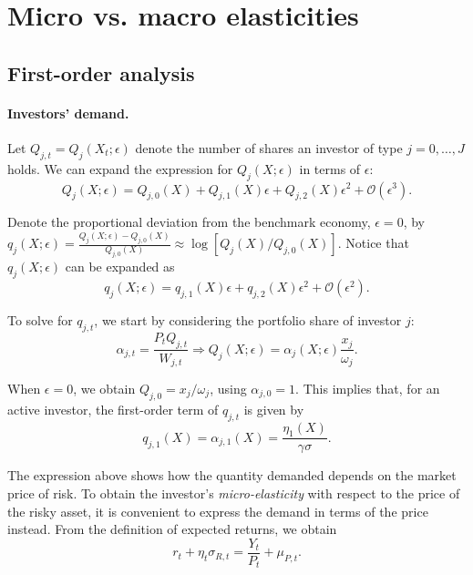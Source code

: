 \documentclass[11pt,english]{article}
\begin{document}
\section{Micro vs. macro elasticities}

\subsection{First-order analysis}

\paragraph{Investors' demand.} Let $Q_{j,t} = Q_j(X_t;\epsilon)$ denote the number of shares an investor of type $j = 0, \ldots, J$ holds. We can expand the expression for $Q_{j}(X;\epsilon)$ in terms of $\epsilon$:
\begin{equation}
    Q_j(X;\epsilon) = Q_{j,0}(X) + Q_{j,1}(X) \epsilon + Q_{j,2}(X) \epsilon^2 + \mathcal{O}(\epsilon^3).
\end{equation}

Denote the proportional deviation from the benchmark economy, $\epsilon = 0$, by $q_{j}(X;\epsilon) = \frac{Q_{j}(X;\epsilon) - Q_{j,0}(X)}{Q_{j,0}(X)} \approx \log [Q_{j}(X)/Q_{j,0}(X)]$. Notice that $q_{j}(X;\epsilon)$ can be expanded as
\begin{equation}
    q_{j}(X;\epsilon) = q_{j,1}(X) \epsilon + q_{j,2}(X) \epsilon^2 + \mathcal{O}(\epsilon^2).
\end{equation}

To solve for $q_{j,t}$, we start by considering the portfolio share of investor $j$:
\begin{equation}
\alpha_{j,t} = \frac{P_t Q_{j,t}}{W_{j,t}} \Rightarrow   Q_{j}(X;\epsilon) = \alpha_j(X;\epsilon) \frac{x_{j}}{\omega_j}.
\end{equation}

When $\epsilon = 0$, we obtain $Q_{j,0} = x_j/\omega_j$, using $\alpha_{j,0} = 1$. This implies that, for an active investor, the first-order term of $q_{j,t}$ is given by
\begin{equation}\label{eq:q_eta}
q_{j,1}(X) = \alpha_{j,1}(X) = \frac{\eta_1(X)}{\gamma \sigma}.
\end{equation}

The expression above shows how the quantity demanded depends on the market price of risk. To obtain the investor's \textit{micro-elasticity} with respect to the price of the risky asset, it is convenient to express the demand in terms of the price instead. From the definition of expected returns, we obtain
\begin{equation}
    r_t + \eta_t \sigma_{R,t} = \frac{Y_t}{P_t} +\mu_{P,t}.
\end{equation}
\end{document}
